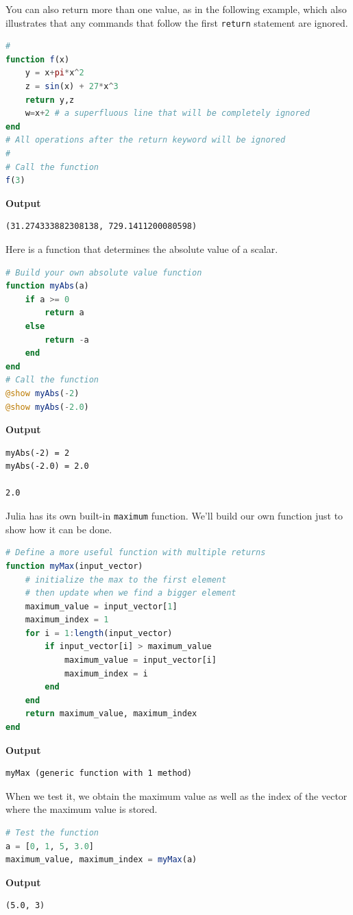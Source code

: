 You can also return more than one value, as in the following example, which also illustrates that any commands that follow the first \texttt{return} statement are ignored.\\

\begin{lstlisting}[language=Julia,style=mystyle]
#
function f(x)
    y = x+pi*x^2
    z = sin(x) + 27*x^3
    return y,z
    w=x+2 # a superfluous line that will be completely ignored 
end
# All operations after the return keyword will be ignored
#
# Call the function
f(3)
\end{lstlisting}
\textbf{Output} 
\begin{verbatim}
(31.274333882308138, 729.1411200080598)
\end{verbatim}

Here is a function that determines the absolute value of a scalar.  \\

\begin{lstlisting}[language=Julia,style=mystyle]
# Build your own absolute value function
function myAbs(a)
    if a >= 0
        return a
    else
        return -a
    end
end
# Call the function
@show myAbs(-2)
@show myAbs(-2.0)
\end{lstlisting}
\textbf{Output} 
\begin{verbatim}
myAbs(-2) = 2
myAbs(-2.0) = 2.0

2.0
\end{verbatim}
Julia has its own built-in \texttt{maximum} function. We'll build our own function just to show how it can be done.

\begin{lstlisting}[language=Julia,style=mystyle]
# Define a more useful function with multiple returns
function myMax(input_vector)
    # initialize the max to the first element 
    # then update when we find a bigger element
    maximum_value = input_vector[1]
    maximum_index = 1
    for i = 1:length(input_vector)
        if input_vector[i] > maximum_value
            maximum_value = input_vector[i]
            maximum_index = i
        end
    end
    return maximum_value, maximum_index
end
\end{lstlisting}
\textbf{Output} 
\begin{verbatim}
myMax (generic function with 1 method)
\end{verbatim}

When we test it, we obtain the maximum value as well as the index of the vector where the maximum value is stored. 
\begin{lstlisting}[language=Julia,style=mystyle]
# Test the function
a = [0, 1, 5, 3.0]
maximum_value, maximum_index = myMax(a)
\end{lstlisting}
\textbf{Output} 
\begin{verbatim}
(5.0, 3)
\end{verbatim}

